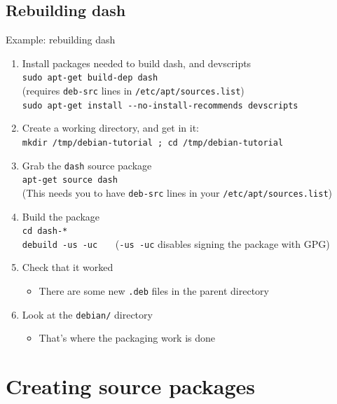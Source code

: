 \documentclass[10pt,final]{beamer}
\begin{document}
\subsection{Rebuilding dash}
\begin{frame}{Example: rebuilding dash}
\begin{enumerate}
\item Install packages needed to build dash, and devscripts\\
  {\texttt{sudo apt-get build-dep dash}\\ (requires \texttt{deb-src} lines in \texttt{/etc/apt/sources.list})}\\
  {\texttt{sudo apt-get install -{}-no-install-recommends devscripts}}
  \hbr
\item Create a working directory, and get in it:\\
 \texttt{mkdir /tmp/debian-tutorial ; cd /tmp/debian-tutorial}
  \hbr
\item Grab the \texttt{dash} source package\\
  \texttt{apt-get source dash}\\ 
  {\small (This needs you to have \texttt{deb-src} lines in your \texttt{/etc/apt/sources.list})}
  \hbr
\item Build the package\\
  {\texttt{cd dash-*\\ debuild -us -uc}} ~~~(\texttt{-us -uc} disables signing the package with GPG)

  \hbr
\item Check that it worked
	\begin{itemize}
		\item  There are some new \texttt{.deb} files in the parent directory
	\end{itemize}
    \hbr
\item Look at the \texttt{debian/} directory
	\begin{itemize}
		\item That's where the packaging work is done
	\end{itemize}
\end{enumerate}
\end{frame}

\section{Creating source packages}
\end{document}
